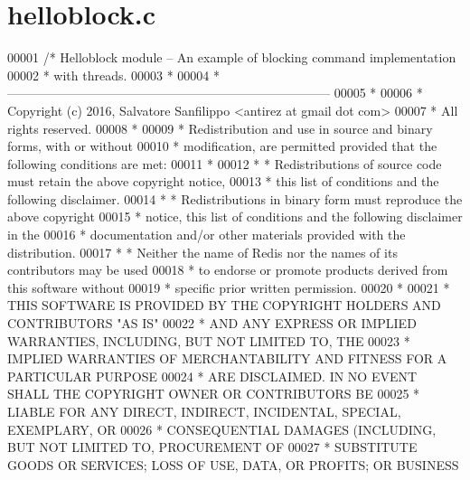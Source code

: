 \hypertarget{helloblock_8c_source}{}\section{helloblock.\+c}
\label{helloblock_8c_source}

\begin{DoxyCode}
00001 \textcolor{comment}{/* Helloblock module -- An example of blocking command implementation}
00002 \textcolor{comment}{ * with threads.}
00003 \textcolor{comment}{ *}
00004 \textcolor{comment}{ * -----------------------------------------------------------------------------}
00005 \textcolor{comment}{ *}
00006 \textcolor{comment}{ * Copyright (c) 2016, Salvatore Sanfilippo <antirez at gmail dot com>}
00007 \textcolor{comment}{ * All rights reserved.}
00008 \textcolor{comment}{ *}
00009 \textcolor{comment}{ * Redistribution and use in source and binary forms, with or without}
00010 \textcolor{comment}{ * modification, are permitted provided that the following conditions are met:}
00011 \textcolor{comment}{ *}
00012 \textcolor{comment}{ *   * Redistributions of source code must retain the above copyright notice,}
00013 \textcolor{comment}{ *     this list of conditions and the following disclaimer.}
00014 \textcolor{comment}{ *   * Redistributions in binary form must reproduce the above copyright}
00015 \textcolor{comment}{ *     notice, this list of conditions and the following disclaimer in the}
00016 \textcolor{comment}{ *     documentation and/or other materials provided with the distribution.}
00017 \textcolor{comment}{ *   * Neither the name of Redis nor the names of its contributors may be used}
00018 \textcolor{comment}{ *     to endorse or promote products derived from this software without}
00019 \textcolor{comment}{ *     specific prior written permission.}
00020 \textcolor{comment}{ *}
00021 \textcolor{comment}{ * THIS SOFTWARE IS PROVIDED BY THE COPYRIGHT HOLDERS AND CONTRIBUTORS "AS IS"}
00022 \textcolor{comment}{ * AND ANY EXPRESS OR IMPLIED WARRANTIES, INCLUDING, BUT NOT LIMITED TO, THE}
00023 \textcolor{comment}{ * IMPLIED WARRANTIES OF MERCHANTABILITY AND FITNESS FOR A PARTICULAR PURPOSE}
00024 \textcolor{comment}{ * ARE DISCLAIMED. IN NO EVENT SHALL THE COPYRIGHT OWNER OR CONTRIBUTORS BE}
00025 \textcolor{comment}{ * LIABLE FOR ANY DIRECT, INDIRECT, INCIDENTAL, SPECIAL, EXEMPLARY, OR}
00026 \textcolor{comment}{ * CONSEQUENTIAL DAMAGES (INCLUDING, BUT NOT LIMITED TO, PROCUREMENT OF}
00027 \textcolor{comment}{ * SUBSTITUTE GOODS OR SERVICES; LOSS OF USE, DATA, OR PROFITS; OR BUSINESS}

\end{DoxyCode}
